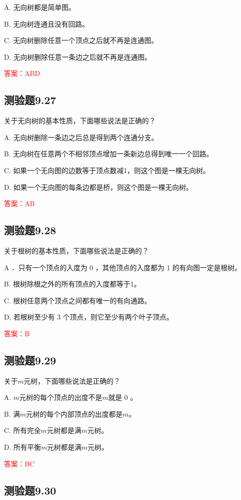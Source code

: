 \documentclass[UTF8, heading=true]{ctexart}
\begin{document}
A. 无向树都是简单图。

B. 无向树连通且没有回路。

C. 无向树删除任意一个顶点之后就不再是连通图。

D. 无向树删除任意一条边之后就不再是连通图。


\textcolor{red}{答案：ABD}

\subsection{测验题9.27}

关于无向树的基本性质，下面哪些说法是正确的？

A. 无向树删除一条边之后总是得到两个连通分支。

B. 无向树在任意两个不相邻顶点增加一条新边总得到唯一一个回路。

C. 如果一个无向图的边数等于顶点数减1，则这个图是一棵无向树。

D. 如果一个无向图的每条边都是桥，则这个图是一棵无向树。

\textcolor{red}{答案：AB}

\subsection{测验题9.28}

关于根树的基本性质，下面哪些说法是正确的？

A ．只有一个顶点的入度为 0 ，其他顶点的入度都为 1 的有向图一定是根树。

B. 根树除根之外的所有顶点的入度都等于1。

C. 根树任意两个顶点之间都有唯一的有向通路。

D. 若根树至少有 3 个顶点，则它至少有两个叶子顶点。

\textcolor{red}{答案：B}

\subsection{测验题9.29}

关于$m$元树，下面哪些说法是正确的？

A. $m$元树的每个顶点的出度不是$m$就是 0 。

B. 满$m$元树的每个内部顶点的出度都是$m$。

C. 所有完全$m$元树都是满$m$元树。

D. 所有平衡$m$元树都是满$m$元树。


\textcolor{red}{答案：BC}

\subsection{测验题9.30}
\end{document}
